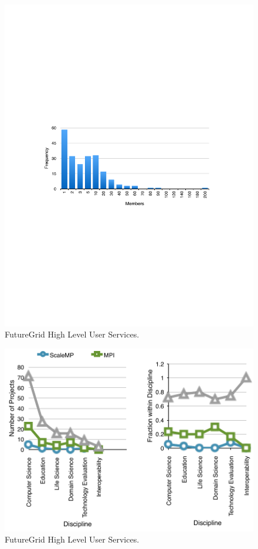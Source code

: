 \begin{figure}[htb]
  \centering
    \includegraphics[width=1.0\textwidth]{images/project-frequency.pdf}
  \caption{FutureGrid High Level User Services.}
\end{figure}

\begin{figure}[htb]
  \centering
    \includegraphics[width=1.0\textwidth]{images/trend-b.pdf}
  \caption{FutureGrid High Level User Services.}
\end{figure}

